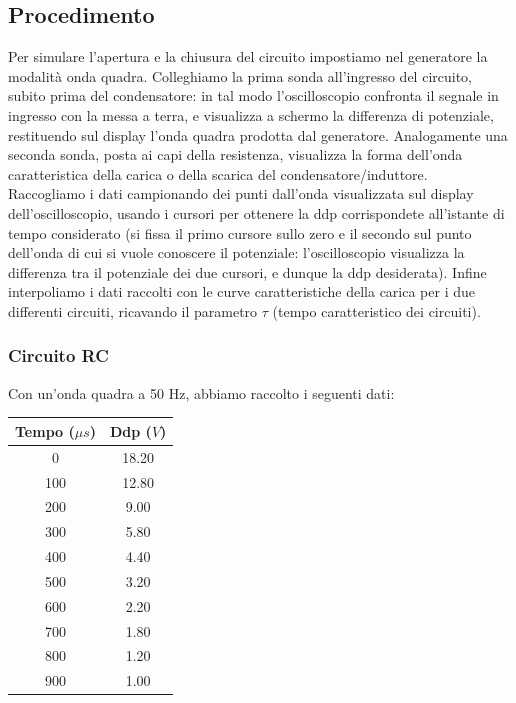 \subsection{Procedimento}


Per simulare l'apertura e la chiusura del circuito impostiamo nel generatore la modalità onda quadra. Colleghiamo la prima sonda all'ingresso del circuito, subito prima del condensatore: in tal modo l'oscilloscopio confronta il segnale in ingresso con la messa a terra, e visualizza a schermo la differenza di potenziale, restituendo sul display l'onda quadra prodotta dal generatore.  
Analogamente una seconda sonda, posta ai capi della resistenza, visualizza la forma dell'onda caratteristica della carica o della scarica del condensatore/induttore. \\
Raccogliamo i dati campionando dei punti dall'onda visualizzata sul display dell'oscilloscopio, usando i cursori per ottenere la ddp corrispondete all'istante di tempo considerato (si fissa il primo cursore sullo zero e il secondo sul punto dell'onda di cui si vuole conoscere il potenziale: l'oscilloscopio visualizza la differenza tra il potenziale dei due cursori, e dunque la ddp desiderata).
Infine interpoliamo i dati raccolti con le curve caratteristiche della carica per i due differenti circuiti, ricavando il parametro $\tau$ (tempo caratteristico dei circuiti).

\subsubsection{Circuito RC}
Con un'onda quadra a 50 Hz, abbiamo raccolto i seguenti dati:

\begin{center}
\begin{tabular}{*{2}{c}}
Tempo ($\mu s$) & Ddp ($V$) \\
\midrule
0 & 18.20 \\
100 & 12.80 \\
200 & 9.00 \\
300 & 5.80 \\
400 & 4.40 \\
500 & 3.20 \\
600 & 2.20 \\
700 & 1.80 \\
800 & 1.20 \\
900 & 1.00 \\
\end{tabular}
\end{center}

